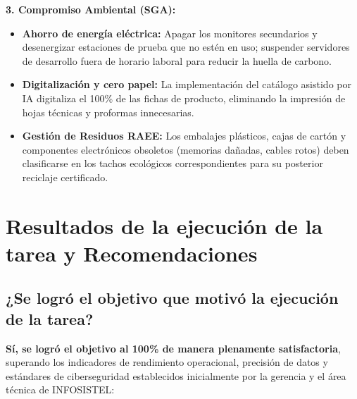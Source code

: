 \documentclass[11pt,a4paper]{article}
\begin{document}
\begin{tcolorbox}[colback=lightgray,colframe=senatiblue,arc=2mm,title=\textbf{REGISTRO DE CHARLA DE CINCO MINUTOS -- SST / SGA}]
\vspace{4pt}
\textbf{3. Compromiso Ambiental (SGA):}
\begin{itemize}
    \item \textbf{Ahorro de energía eléctrica:} Apagar los monitores secundarios y desenergizar estaciones de prueba que no estén en uso; suspender servidores de desarrollo fuera de horario laboral para reducir la huella de carbono.
    \item \textbf{Digitalización y cero papel:} La implementación del catálogo asistido por IA digitaliza el 100\% de las fichas de producto, eliminando la impresión de hojas técnicas y proformas innecesarias.
    \item \textbf{Gestión de Residuos RAEE:} Los embalajes plásticos, cajas de cartón y componentes electrónicos obsoletos (memorias dañadas, cables rotos) deben clasificarse en los tachos ecológicos correspondientes para su posterior reciclaje certificado.
\end{itemize}
\end{tcolorbox}

\newpage

\section{Resultados de la ejecución de la tarea y Recomendaciones}

\subsection{¿Se logró el objetivo que motivó la ejecución de la tarea?}

\textbf{Sí, se logró el objetivo al 100\% de manera plenamente satisfactoria}, superando los indicadores de rendimiento operacional, precisión de datos y estándares de ciberseguridad establecidos inicialmente por la gerencia y el área técnica de INFOSISTEL:
\end{document}

